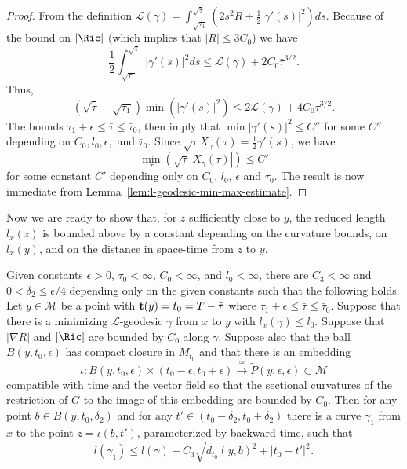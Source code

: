 \begin{proof}
\sketch
{}
From the definition
${\mathcal L}(\gamma)=\int_{\sqrt{\tau_1}}^{\sqrt{\bar\tau}}
(2s^2R+\frac{1}{2}|\gamma'(s)|^2)ds$. Because of the bound on $|\Ric|$ (which implies that $|R|\le 3C_0$) we have
$$\frac{1}{2}\int_{\sqrt{\tau_1}}^{\sqrt{\bar\tau}}|\gamma'(s)|^2ds\le {\mathcal L}(\gamma)+
2C_0\bar\tau^{3/2}.$$ Thus,
$$(\sqrt{\bar \tau}-\sqrt{\tau_1})\min(|\gamma'(s)|^2)\le 2{\mathcal L}(\gamma)+
4C_0\bar\tau^{3/2}.$$ The bounds $\tau_1+\epsilon\le \bar\tau\le\bar\tau_0$,
then imply that $\min|\gamma'(s)|^2\le C''$ for some $C''$ depending on
$C_0,l_0,\epsilon,$ and $\bar\tau_0$. Since
$\sqrt{\tau}X_\gamma(\tau)=\frac{1}{2}\gamma'(s)$, we have
$$\min_{\tau}\left(\sqrt{\tau}|X_\gamma(\tau)|\right)\le C'$$ for some constant $C'$ depending
only on $C_0$, $l_0$, $\epsilon$ and $\bar\tau_0$. The result is now immediate
from Lemma~\ref{lem:l-geodesic-min-max-estimate}.
\end{proof}

Now we are ready to show that, for $z$ sufficiently close to  $y$,
the reduced length $l_x(z)$ is bounded above by a constant depending
on the curvature bounds, on $l_x(y)$, and on the distance in
space-time from $z$ to $y$.


\begin{lemma}\label{lem:reduced-length-upper-bound-nearby}
\label{upperbd}
Given constants  $\epsilon>0$, $\bar\tau_0<\infty$, $C_0<\infty$,
and $l_0<\infty$, there are $C_3<\infty$ and $0<\delta_2\le
\epsilon/4$ depending only on the  given constants  such that the
following holds. Let $y\in {\mathcal M}$ be a point with ${\bf
t}(y)=t_0=T-\bar\tau$ where $\tau_1+\epsilon\le \bar\tau\le
\bar\tau_0$. Suppose that there is a minimizing ${\mathcal
L}$-geodesic $\gamma$ from $x$ to $y$ with $l_x(\gamma)\le l_0$.
Suppose that $|\nabla R|$ and $|\Ric|$ are bounded by $C_0$
along $\gamma$. Suppose also that the ball $B(y,t_0,\epsilon)$ has
compact closure in $M_{t_0}$ and that there is an embedding
$$\iota\colon B(y,t_0,\epsilon)\times (t_0-\epsilon,t_0+\epsilon)\stackrel
{\cong}{\longrightarrow} \tilde P(y,\epsilon,\epsilon)\subset
{\mathcal M}$$ compatible with  time  and the vector field so that
the sectional curvatures of the restriction of $G$ to the image of
this embedding are bounded by $C_0$. Then for any point $b\in
B(y,t_0,\delta_2)$ and for any $t'\in (t_0-\delta_2,t_0+\delta_2)$
there is a curve $\gamma_1$ from $x$ to the point $z=\iota(b,t')$,
parameterized by backward time, such that
$$l(\gamma_1)\le  l(\gamma)+C_3\sqrt{d_{t_0}(y,b)^2+|t_0-t'|^2}.$$
\end{lemma}

